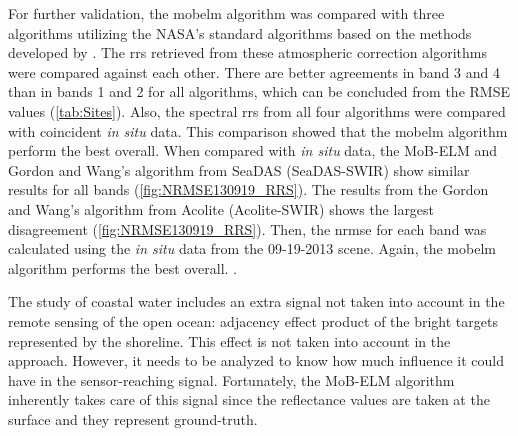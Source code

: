
For further validation, the \gls{mobelm} algorithm was compared with three algorithms utilizing the NASA's standard algorithms based on the methods developed by \cite{Gordon:1994}. The \gls{rrs} retrieved from these atmospheric correction algorithms were compared against each other. There are better agreements in band 3 and 4 than in bands 1 and 2 for all algorithms, which can be concluded from the RMSE values (\autoref{tab:Sites}). Also, the spectral \gls{rrs} from all four algorithms were compared with coincident {\it in situ} data. This comparison showed that the \gls{mobelm} algorithm perform the best overall.  When compared with {\it in situ} data, the MoB-ELM and Gordon and Wang's algorithm from SeaDAS (SeaDAS-SWIR) show similar results for all bands (\autoref{fig:NRMSE130919_RRS}). The results from the Gordon and Wang's algorithm from Acolite (Acolite-SWIR) shows the largest disagreement (\autoref{fig:NRMSE130919_RRS}). Then, the \gls{nrmse} for each band was calculated using the {\it in situ} data from the 09-19-2013 scene. Again, the \gls{mobelm} algorithm performs the best overall. .

The study of coastal water includes an extra signal not taken into account in the remote sensing of the open ocean: adjacency effect product of the bright targets represented by the shoreline. This effect is not taken into account in the \cite{Gordon:1994} approach. However, it needs to be analyzed to know how much influence it could have in the sensor-reaching signal. Fortunately, the MoB-ELM algorithm inherently takes care of this signal since the reflectance values are taken at the surface and they represent ground-truth.


